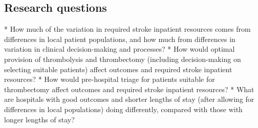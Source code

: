 \subsection{Research questions}

\begin{markdown}
* How much of the variation in required stroke inpatient resources comes from differences in local patient populations, and how much from differences in variation in clinical decision-making and processes?
* How would optimal provision of thrombolysis and thrombectomy (including decision-making on selecting suitable patients) affect outcomes and required stroke inpatient resources?
* How would pre-hospital triage for patients suitable for thrombectomy affect outcomes and required stroke inpatient resources?
* What are hospitals with good outcomes and shorter lengths of stay (after allowing for differences in local populations) doing differently, compared with those with longer lengths of stay?
\end{markdown}

